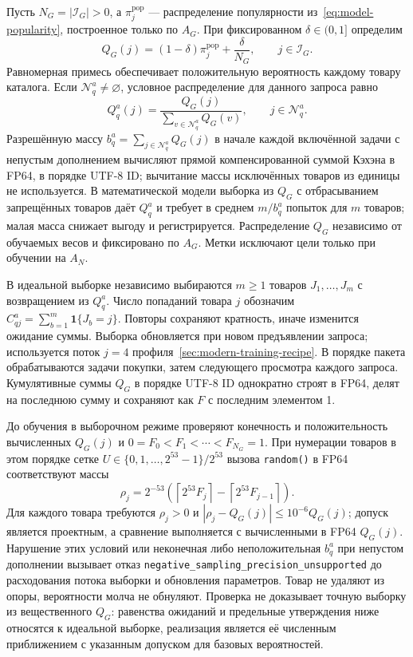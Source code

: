 \documentclass[12pt,a4paper]{article}
\newcommand{\code}[1]{{\ttfamily\small\nolinkurl{#1}}}
\newcommand{\ind}{\mathbf 1}
\theoremstyle{plainru}
\begin{document}
Пусть $N_G=|\mathcal I_G|>0$, а $\pi_j^{\mathrm{pop}}$ ---
распределение популярности из~\eqref{eq:model-popularity},
построенное только по $A_G$. При фиксированном $\delta\in(0,1]$
определим
\begin{equation}\label{eq:sampled-base-proposal}
Q_G(j)=(1-\delta)\pi_j^{\mathrm{pop}}+\frac{\delta}{N_G},
\qquad j\in\mathcal I_G.
\end{equation}
Равномерная примесь обеспечивает положительную вероятность
каждому товару каталога. Если $\mathcal N_q^a\ne\varnothing$,
условное распределение для данного запроса равно
\begin{equation}\label{eq:sampled-proposal}
Q_q^a(j)=
\frac{Q_G(j)}
{\sum_{v\in\mathcal N_q^a}Q_G(v)},
\qquad j\in\mathcal N_q^a.
\end{equation}
Разрешённую массу $b_q^a=\sum_{j\in\mathcal N_q^a}Q_G(j)$
в начале каждой включённой задачи с непустым дополнением вычисляют
прямой компенсированной суммой Кэхэна в FP64, в порядке UTF-8 ID;
вычитание массы исключённых товаров из единицы не используется.
В математической модели выборка из $Q_G$ с отбрасыванием запрещённых
товаров даёт $Q_q^a$ и требует в среднем $m/b_q^a$ попыток для $m$
товаров; малая масса снижает выгоду и регистрируется.
Распределение $Q_G$ независимо от обучаемых весов и фиксировано по $A_G$.
Метки исключают цели только при обучении на $A_N$.

В идеальной выборке независимо выбираются $m\ge1$ товаров
$J_1,\ldots,J_m$ с возвращением из $Q_q^a$.
Число попаданий товара $j$ обозначим
$C_{qj}^a=\sum_{b=1}^{m}\ind\{J_b=j\}$.
Повторы сохраняют кратность, иначе изменится ожидание суммы.
Выборка обновляется при новом предъявлении запроса;
используется поток $j=4$ профиля~\ref{sec:modern-training-recipe}.
В порядке пакета обрабатываются задачи покупки, затем следующего
просмотра каждого запроса. Кумулятивные суммы $Q_G$ в порядке UTF-8 ID
однократно строят в FP64, делят на последнюю сумму и сохраняют как $F$
с последним элементом 1.

До обучения в выборочном режиме проверяют конечность и положительность
вычисленных $Q_G(j)$ и $0=F_0<F_1<\cdots<F_{N_G}=1$.
При нумерации товаров в этом порядке сетке
$U\in\{0,1,\ldots,2^{53}-1\}/2^{53}$ вызова \code{random()}
в FP64 соответствуют массы
\[
\rho_j=2^{-53}\left(\left\lceil2^{53}F_j\right\rceil
-\left\lceil2^{53}F_{j-1}\right\rceil\right).
\]
Для каждого товара требуются $\rho_j>0$ и
$|\rho_j-Q_G(j)|\le10^{-6}Q_G(j)$; допуск является проектным,
а сравнение выполняется с вычисленными в FP64 $Q_G(j)$.
Нарушение этих условий или неконечная либо неположительная $b_q^a$
при непустом дополнении вызывает отказ
\code{negative_sampling_precision_unsupported} до расходования потока
выборки и обновления параметров. Товар не удаляют из опоры,
вероятности молча не обнуляют. Проверка не доказывает точную выборку
из вещественного $Q_G$: равенства ожиданий и предельные утверждения
ниже относятся к идеальной выборке, реализация является её численным
приближением с указанным допуском для базовых вероятностей.
\end{document}

